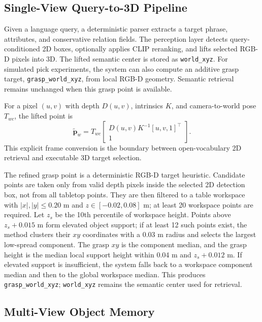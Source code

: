 \documentclass[conference]{IEEEtran}
\begin{document}
\subsection{Single-View Query-to-3D Pipeline}

Given a language query, a deterministic parser extracts a target phrase,
attributes, and conservative relation fields. The perception layer detects
query-conditioned 2D boxes, optionally applies CLIP reranking, and lifts
selected RGB-D pixels into 3D. The lifted semantic center is stored as
\texttt{world\_xyz}. For simulated pick experiments, the system can also compute
an additive grasp target, \texttt{grasp\_world\_xyz}, from local RGB-D geometry.
Semantic retrieval remains unchanged when this grasp point is available.

For a pixel $(u,v)$ with depth $D(u,v)$, intrinsics $K$, and camera-to-world
pose $T_{wc}$, the lifted point is
\begin{equation}
\tilde{\mathbf{p}}_w =
T_{wc}
\begin{bmatrix}
D(u,v)K^{-1}[u,v,1]^\top\\
1
\end{bmatrix}.
\end{equation}
This explicit frame conversion is the boundary between open-vocabulary 2D
retrieval and executable 3D target selection.

The refined grasp point is a deterministic RGB-D target heuristic. Candidate
points are taken only from valid depth pixels inside the selected 2D detection
box, not from all tabletop points. They are then filtered to a table workspace
with
$|x|,|y|\leq0.20$ m and $z\in[-0.02,0.08]$ m; at least 20 workspace points are
required. Let $z_s$ be the 10th percentile of workspace height. Points above
$z_s+0.015$ m form elevated object support; if at least 12 such points exist,
the method clusters their $xy$ coordinates with a 0.03 m radius and selects the
largest low-spread component. The grasp $xy$ is the component median, and the
grasp height is the median local support height within 0.04 m and
$z_s+0.012$ m. If elevated support is insufficient, the system falls back to a
workspace component median and then to the global workspace median. This
produces \texttt{grasp\_world\_xyz}; \texttt{world\_xyz} remains the semantic
center used for retrieval.

\subsection{Multi-View Object Memory}
\end{document}
